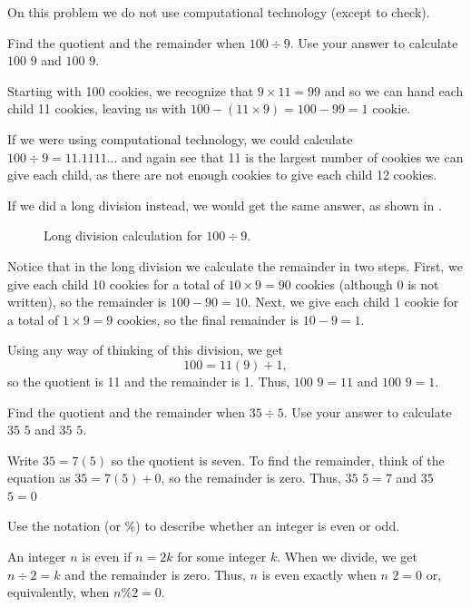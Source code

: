 \begin{exam}
\label{exam_quo_rem_div_mod}
On this problem we do not use computational technology (except to check).
\begin{apart}
    \item Find the quotient and the remainder when $100 \div 9$.  Use your answer to calculate $100$  $9$ and $100$  $9$.
        \begin{soln}
            Starting with 100 cookies, we recognize that $9 \times 11 = 99$ and so we can hand each child 11 cookies, leaving us with $100 - (11\times 9) = 100-99 = 1$ cookie.

            If we were using computational technology, we could calculate $100 \div 9 = 11.1111...$ and again see that 11 is the largest number of cookies we can give each child, as there are not enough cookies to give each child 12 cookies.
            
            If we did a long division instead, we would get the same answer, as shown in .
            \begin{figure} [hbtp]
                \centering
                \caption{Long division calculation for $100 \div 9$.}
                \label{fig_longdivision_100div9}
            \end{figure}
            Notice that in the long division we calculate the remainder in two steps. First, we give each child 10 cookies for a total of $10 \times 9 = 90$ cookies (although 0 is not written), so the remainder is $100-90 = 10$.  Next, we give each child 1 cookie for a total of $1 \times 9 = 9$ cookies, so the final remainder is $10-9=1$.  
            
            Using any way of thinking of this division, we get $$ 100 = 11(9) +1,$$ so the quotient is 11 and the remainder is 1.  Thus, $100$  $9=11$ and $100$  $9=1$.
        \end{soln}
    \item Find the quotient and the remainder when $35 \div 5$.  Use your answer to calculate $35$  $5$ and $35$  $5$.
        \begin{soln}
            Write $35 = 7(5)$ so the quotient is seven.  To find the remainder, think of the equation as $35 = 7(5)+0$, so the remainder is zero.  Thus, $35$  $5=7$ and $35$  $5=0$
        \end{soln}     
    \item Use the  notation (or \%) to describe whether an integer is even or odd.
        \begin{soln}
            An integer $n$ is even if $n=2k$ for some integer $k$.  When we divide, we get $n \div 2 = k$ and the remainder is zero. Thus, $n$ is even exactly when $n$  $2=0$ or, equivalently, when $n\%2=0$.


\end{soln}
\end{apart}
\end{exam}
